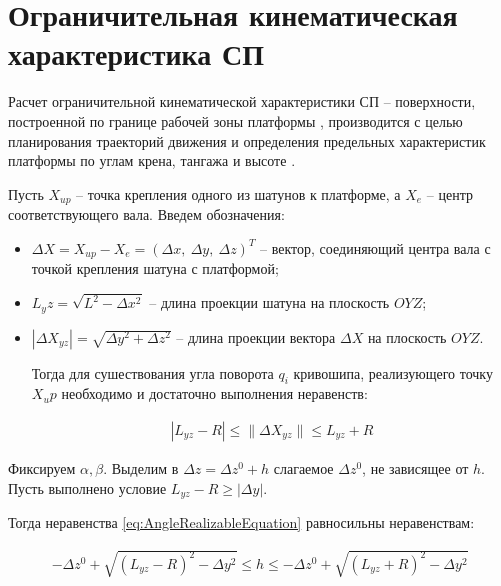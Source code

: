 \section{Ограничительная кинематическая характеристика СП}
Расчет ограничительной кинематической характеристики СП -- поверхности, построенной по границе рабочей зоны платформы \cite{Bonev2001}, производится с целью планирования траекторий движения и определения предельных характеристик платформы по углам крена, тангажа и высоте \cite{PhGuglielmetti, Alvan2003, Gugliemetti1994, Asif2011, Bandyopadhyay2009, Davliakos2008}.

Пусть $X_{up}$ -- точка крепления одного из шатунов к платформе, а $X_e$ -- центр соответствующего вала. Введем обозначения:

\begin{itemize}
\item $\Delta X = X_{up} - X_e = \left(\Delta x,~\Delta y,~\Delta z\right)^T$ -- вектор, соединяющий центра вала с точкой крепления шатуна с платформой;
\item $L_yz = \sqrt{L^2 - \Delta x^2}$ -- длина проекции шатуна на плоскость $OYZ$;
\item $\left|\Delta X_{yz}\right| = \sqrt{\Delta y^2 + \Delta z^2}$ -- длина проекции вектора $\Delta X$ на плоскость $OYZ$.

Тогда для сушествования угла поворота $q_i$ кривошипа, реализующего точку $X_up$ необходимо и достаточно выполнения неравенств:

\begin{equation}
\label{eq:AngleRealizableEquation}
\begin{aligned}
	\left|L_{yz}-R\right| \leq \| \Delta X_{yz} \| \leq L_{yz} + R
\end{aligned}
\end{equation}
\end{itemize}

Фиксируем $\alpha, \beta$. Выделим в $\Delta z = \Delta z^0 + h$ слагаемое $\Delta z^0$, не зависящее от $h$. Пусть выполнено условие $L_{yz} - R \geqslant \left|\Delta y\right|$.

Тогда неравенства \ref{eq:AngleRealizableEquation} равносильны неравенствам:

\begin{equation}
\begin{aligned}
-\Delta z^0 + \sqrt{\left(L_{yz}-R\right)^2 - \Delta y^2} \leq h \leq -\Delta z^0 + \sqrt{\left(L_{yz}+R\right)^2 - \Delta y^2}
\end{aligned}
\end{equation}

